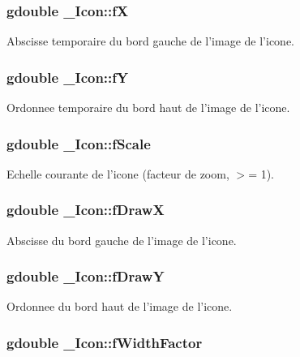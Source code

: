 \subsubsection{\setlength{\rightskip}{0pt plus 5cm}gdouble {\bf \_\-Icon::fX}}\label{struct__Icon_3a3122cc6289ff8ccb7d9b42a06d04a7}


Abscisse temporaire du bord gauche de l'image de l'icone. 

\subsubsection{\setlength{\rightskip}{0pt plus 5cm}gdouble {\bf \_\-Icon::fY}}\label{struct__Icon_f4a944821adc3537be4b446ff91cce97}


Ordonnee temporaire du bord haut de l'image de l'icone. 

\subsubsection{\setlength{\rightskip}{0pt plus 5cm}gdouble {\bf \_\-Icon::fScale}}\label{struct__Icon_846ecd1a0cbaa564754174d8f2c14eaa}


Echelle courante de l'icone (facteur de zoom, $>$= 1). 

\subsubsection{\setlength{\rightskip}{0pt plus 5cm}gdouble {\bf \_\-Icon::fDrawX}}\label{struct__Icon_34493db10621cd2a88a758d808ba1dc0}


Abscisse du bord gauche de l'image de l'icone. 

\subsubsection{\setlength{\rightskip}{0pt plus 5cm}gdouble {\bf \_\-Icon::fDrawY}}\label{struct__Icon_004da82f852571bd9a1079f8a0feb3ce}


Ordonnee du bord haut de l'image de l'icone. 

\subsubsection{\setlength{\rightskip}{0pt plus 5cm}gdouble {\bf \_\-Icon::fWidthFactor}}\label{struct__Icon_abc592ad16e6cbc0b7a8c0e0b0e49cc8}



